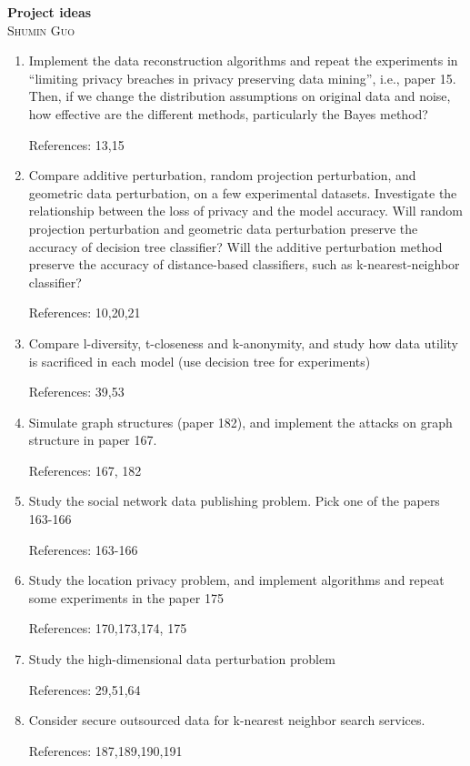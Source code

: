\documentclass[12pt]{article}
\begin{document}
\begin{center}                  %
\textbf{\large{Project ideas}} \\ 
\small\textsc{Shumin Guo} \\
\end{center}

\begin{enumerate}

\item Implement the data reconstruction algorithms and repeat the
experiments in “limiting privacy breaches in privacy preserving data
mining”, i.e., paper 15. Then, if we change the distribution
assumptions on original data and noise, how effective are the
different methods, particularly the Bayes method? 

References: 13,15
 
\item Compare additive perturbation, random projection perturbation, and
geometric data perturbation, on a few experimental
datasets. Investigate the relationship between the loss of privacy and
the model accuracy. Will random projection perturbation and geometric
data perturbation preserve the accuracy of decision tree classifier?
Will the additive perturbation method preserve the accuracy of
distance-based classifiers, such as k-nearest-neighbor classifier? 

References: 10,20,21
 
\item Compare l-diversity, t-closeness and k-anonymity, and study how data
utility is sacrificed in each model (use decision tree for
experiments) 
 
References: 39,53
 
\item Simulate graph structures (paper 182), and implement the attacks on
graph structure in paper 167. 

References: 167, 182
 
\item Study the social network data publishing problem. Pick one of the
papers 163-166 

References: 163-166
 
\item Study the location privacy problem, and implement algorithms and
repeat some experiments in the paper 175 

References: 170,173,174, 175
 
\item Study the high-dimensional data perturbation problem

References: 29,51,64
 
\item Consider secure outsourced data for k-nearest neighbor search services.

References: 187,189,190,191 

\end{enumerate}
\end{document}
